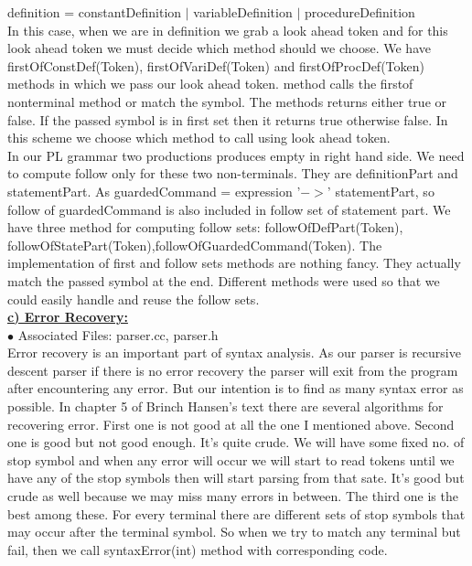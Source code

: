\documentclass[paper=letter, fontsize=11pt]{scrartcl} %
\begin{document}
definition = constantDefinition $\mid$ variableDefinition $\mid$ procedureDefinition\\

In this case, when we are in definition we grab a look ahead token and for this look ahead token we must decide which method should we choose. We have firstOfConstDef(Token), firstOfVariDef(Token) and firstOfProcDef(Token) methods in which we pass our look ahead token. method calls the  firstof nonterminal method or match the symbol. The methods returns either true or false. If the passed symbol is in first set then it returns true otherwise false. In this scheme we choose which method to call using look ahead token.\\

In our PL grammar two productions produces empty in right hand side. We need to compute follow only for these two non-terminals. They are definitionPart and statementPart. As guardedCommand = expression '$->$' statementPart, so follow of guardedCommand is also included in follow set of statement part. We have three method for computing follow sets:  followOfDefPart(Token), followOfStatePart(Token),followOfGuardedCommand(Token). The implementation of first and follow sets methods are nothing fancy. They actually match the passed symbol at the end. Different methods were used so that we could easily handle and reuse the follow sets.\\

\pagebreak
\underline {\bf c) Error Recovery:}\\
$\bullet$ Associated Files: parser.cc, parser.h\\ 

Error recovery is an important part of syntax analysis. As our parser is recursive descent parser if there is no error recovery the parser will exit from the program after encountering any error. But our intention is to find as many syntax error as possible. In chapter 5 of Brinch Hansen's text there are several algorithms for recovering error. First one is not good at all the one I mentioned above. Second one is good but not good enough. It's quite crude. We will have some fixed no. of stop symbol and when any error will occur we will start to read tokens until we have any of the stop symbols then will start parsing from that sate. It's good but crude as well because we may miss many errors in between. The third one is the best among these. For every terminal there are different sets of stop symbols that may occur after the terminal symbol. So when we try to match any terminal but fail, then we call syntaxError(int) method with corresponding code.
\end{document}
